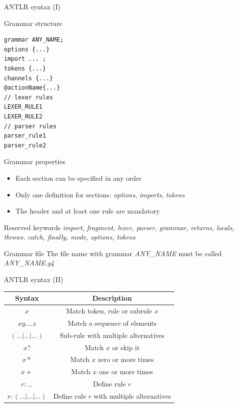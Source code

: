 \documentclass{beamer}
\begin{document}
\begin{frame}[fragile]{ANTLR syntax (I)}

	\begin{minipage}[t]{0.3\textwidth}
		\begin{exampleblock}{Grammar structure}		
			\footnotesize
			\begin{lstlisting}
grammar ANY_NAME;
options {...}
import ... ;
tokens {...}
channels {...}
@actionName{...}
// lexer rules
LEXER_RULE1
LEXER_RULE2
// parser rules
parser_rule1
parser_rule2			
			\end{lstlisting}
		\end{exampleblock}
	\end{minipage}
	\noindent\hfill
	\begin{minipage}[t]{0.65\textwidth}
		\begin{block}{Grammar properties}
			\begin{itemize}
				\item Each section can be specified in any order
				\item Only one definition for sections: \textit{options}, \textit{imports}, \textit{tokens}
				\item The header and at least one rule are mandatory
			\end{itemize}
		\end{block}

			\begin{alertblock}{Reserved keywords}
				\textit{import, fragment, lexer, parser, grammar, returns, locals, throws, catch, finally, mode, options, tokens}
			\end{alertblock}
			
	\end{minipage}
		\begin{alertblock}{Grammar file}
			The file name with grammar \textit{ANY\_NAME} must be called \textit{ANY\_NAME.g4}
		\end{alertblock}	

\end{frame}

\begin{frame}{ANTLR syntax (II)}
	\begin{table}[H]
		\begin{tabular}{c|c}
			\textbf{Syntax} & \textbf{Description} \\
			\hline
			$x$ & Match token, rule or subrule $x$ \\
			$x y ....z$ & Match a sequence of elements \\
			$(...|...|...)$ & Sub-rule with multiple alternatives \\
			$x?$ & Match $x$ or skip it \\
			$x*$ & Match $x$ zero or more times \\
			$x+$ & Match $x$ one or more times \\
			$r: ...$ & Define rule $r$ \\
			$r: (...|...|...)$ & Define rule $r$ with multiple alternatives
		\end{tabular}
	\end{table}
\end{frame}
\end{document}
